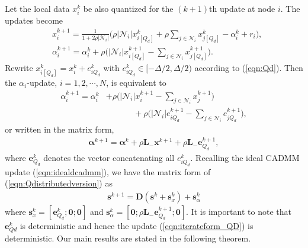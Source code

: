 \documentclass[journal]{IEEEtran}
\newcommand{\nn}{\nonumber}
\begin{document}
Let the local data $x_i^k$ be also quantized for the $(k+1)$th update at node $i$. The updates become
\begin{equation}
\label{eqn:Qdistributedversion}
\begin{aligned}
&x_i^{k+1}=\frac{1}{1+2\rho|\mathcal{N}_i|}\Bigg(\rho|\mathcal{N}_i|x_{i[Q_d]}^k+\rho\sum_{j\in\mathcal{N}_i} x_{j[Q_d]}^k-\alpha_i^k+r_i\Bigg),\\
&\alpha_i^{k+1}=\alpha_i^k+\rho\Bigg(|\mathcal{N}_i|x_{i[Q_d]}^{k+1}-\sum_{j\in\mathcal{N}_i} x_{j[Q_d]}^{k+1}\Bigg).
\end{aligned}
\end{equation}
Rewrite $x_{i[Q_d]}^k=x_i^k+e_{iQ_d}^k$ with $e_{iQ_d}^k\in[-\Delta/2,\Delta/2)$ according to (\ref{eqn:Qd}). Then the $\alpha_i$-update, $i=1,2,\cdots,N$, is equivalent to 
\begin{align}
\alpha_i^{k+1} = \alpha^k_i&+\rho\Bigg(|\mathcal{N}_i|x_{i}^{k+1}-\sum_{j\in\mathcal{N}_i} x_{j}^{k+1}\Bigg)\nn\\
&~~~~~~~~~~~~~~~+\rho\Bigg(|\mathcal{N}_i|e_{iQ_d}^{k+1}-\sum_{j\in\mathcal{N}_i} e_{jQ_d}^{k+1}\Bigg),\nn
\end{align}
or written in the matrix form,
\begin{align}
\label{eqn:alphamatrixupdate}
\bm\alpha^{k+1}=\bm\alpha^k+\rho{\bm L}_-\bm x^{k+1}+\rho\bm L_-\bm e^{k+1}_{Q_d},
\end{align}
where $\bm e_{Q_d}^k$ denotes the vector concatenating all $e_{iQ_d}^k$. Recalling the ideal CADMM update (\ref{eqn:idealdcadmm}), we have the matrix form of (\ref{eqn:Qdistributedversion}) as
\begin{equation}
\label{eqn:iterateform_QD}
\begin{aligned}
\bm s^{k+1}=\bm D(\bm s^k+\bm {s}_{x}^{k})+\bm {s}_\alpha^k
\end{aligned}
\end{equation}
where $\bm s_x^k=[\bm e^k_{Q_d};\bm 0;\bm 0]$ and $\bm s_\alpha^k=[\bm 0; \rho\bm L_- \bm e^{k+1}_{Q_d};\bm 0]$. It is important to note that $\bm e_{Qd}^k$ is deterministic and hence the update (\ref{eqn:iterateform_QD}) is deterministic. Our main results are stated in the following theorem.
\end{document}
